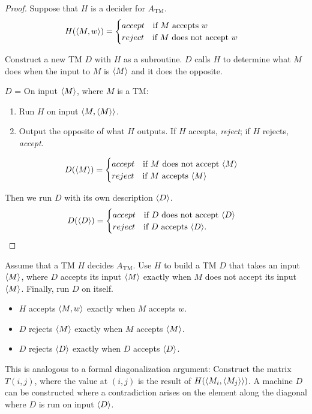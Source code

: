 \begin{mdframed}
\begin{proof}
Suppose that $H$ is a decider for $A_\text{TM}$.
\[
H(\langle{M, w}\rangle) = \begin{cases}
accept \quad \text{if $M$ accepts $w$}\\
reject \quad \text{if $M$ does not accept $w$}
\end{cases}
\]

Construct a new TM $D$ with $H$ as a subroutine. $D$ calls $H$ to determine what $M$ does when the input to $M$ is $\langle{M}\rangle$ and it does the opposite.

\medskip
$D$ = On input $\langle{M}\rangle$, where $M$ is a TM:
\begin{enumerate}
\item Run $H$ on input $\langle{M, \langle{M}\rangle}\rangle$.
\item Output the opposite of what $H$ outputs. If $H$ accepts, \textit{reject}; if $H$ rejects, \textit{accept}.
\end{enumerate}

\[
D(\langle{M}\rangle) =\begin{cases}
accept \quad \text{if $M$ does not accept $\langle{M}\rangle$} \\
reject \quad \text{if $M$ accepts $\langle{M}\rangle$}
\end{cases}
\]

Then we run $D$ with its own description $\langle{D}\rangle$.
\[
D(\langle{D}\rangle) = \begin{cases}
accept \quad \text{if $D$ does not accept $\langle{D}\rangle$}\\
reject \quad \text{if $D$ accepts $\langle{D}\rangle$}.
\end{cases}
\]
\end{proof}
\end{mdframed}

Assume that a TM $H$ decides $A_\text{TM}$. Use $H$ to build a TM $D$ that takes an input $\langle{M}\rangle$, where $D$ accepts its input $\langle{M}\rangle$ exactly when $M$ does not accept its input $\langle{M}\rangle$. Finally, run $D$ on itself.
\begin{itemize}
\item $H$ accepts $\langle{M, w}\rangle$ exactly when $M$ accepts $w$.
\item $D$ rejects $\langle{M}\rangle$ exactly when $M$ accepts $\langle{M}\rangle$.
\item $D$ rejects $\langle{D}\rangle$ exactly when $D$ accepts $\langle{D}\rangle$.
\end{itemize}

This is analogous to a formal diagonalization argument: Construct the matrix $T(i,j)$, where the value at $(i, j)$ is the result of $H(\langle{M_i, \langle{M_j}\rangle}\rangle)$. A machine $D$ can be constructed where a contradiction arises on the element along the diagonal where $D$ is run on input $\langle{D}\rangle$.

